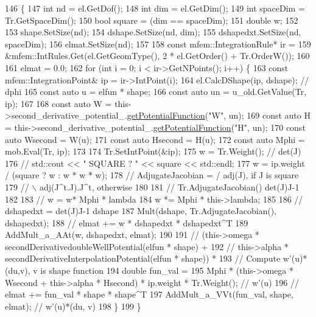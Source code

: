 \begin{DoxyCode}
146                             \{
147   \textcolor{keywordtype}{int} nd = el.GetDof();
148   \textcolor{keywordtype}{int} dim = el.GetDim();
149   \textcolor{keywordtype}{int} spaceDim = Tr.GetSpaceDim();
150   \textcolor{keywordtype}{bool} square = (dim == spaceDim);
151   \textcolor{keywordtype}{double} w;
152 
153   shape.SetSize(nd);
154   dshape.SetSize(nd, dim);
155   dshapedxt.SetSize(nd, spaceDim);
156   elmat.SetSize(nd);
157 
158   \textcolor{keyword}{const} mfem::IntegrationRule* ir =
159       &mfem::IntRules.Get(el.GetGeomType(), 2 * el.GetOrder() + Tr.OrderW());
160 
161   elmat = 0.0;
162   \textcolor{keywordflow}{for} (\textcolor{keywordtype}{int} i = 0; i < ir->GetNPoints(); i++) \{
163     \textcolor{keyword}{const} mfem::IntegrationPoint& ip = ir->IntPoint(i);
164     el.CalcDShape(ip, dshape);  \textcolor{comment}{// dphi}
165     \textcolor{keyword}{const} \textcolor{keyword}{auto} u = elfun * shape;
166     \textcolor{keyword}{const} \textcolor{keyword}{auto} un = u\_old.GetValue(Tr, ip);
167 
168     \textcolor{keyword}{const} \textcolor{keyword}{auto} W = this->second\_derivative\_potential\_.\hyperlink{classPotentialFunctions_a63a86cbadc57d531e0c0fa987ac9fea6}{getPotentialFunction}(\textcolor{stringliteral}{"W"}, un);
169     \textcolor{keyword}{const} \textcolor{keyword}{auto} H = this->second\_derivative\_potential\_.\hyperlink{classPotentialFunctions_a63a86cbadc57d531e0c0fa987ac9fea6}{getPotentialFunction}(\textcolor{stringliteral}{"H"}, un);
170     \textcolor{keyword}{const} \textcolor{keyword}{auto} Wsecond = W(u);
171     \textcolor{keyword}{const} \textcolor{keyword}{auto} Hsecond = H(u);
172     \textcolor{keyword}{const} \textcolor{keyword}{auto} Mphi = mob.Eval(Tr, ip);
173 
174     Tr.SetIntPoint(&ip);
175     w = Tr.Weight();  \textcolor{comment}{// det(J)}
176     \textcolor{comment}{// std::cout << " SQUARE  ? " << square << std::endl;}
177     w = ip.weight / (square ? w : w * w * w);
178     \textcolor{comment}{// AdjugateJacobian = / adj(J),         if J is square}
179     \textcolor{comment}{//                    \(\backslash\) adj(J^t.J).J^t, otherwise}
180 
181     \textcolor{comment}{// Tr.AdjugateJacobian() det(J)J-1}
182 
183     \textcolor{comment}{// w = w* Mphi * lambda}
184     w *= Mphi * this->lambda;
185 
186     \textcolor{comment}{// dshapedxt =  det(J)J-1 dshape}
187     Mult(dshape, Tr.AdjugateJacobian(), dshapedxt);
188     \textcolor{comment}{// elmat += w * dshapedxt * dshapedxt^T}
189     AddMult\_a\_AAt(w, dshapedxt, elmat);
190 
191     \textcolor{comment}{//  (this->omega * secondDerivativedoubleWellPotential(elfun * shape) +}
192     \textcolor{comment}{//   this->alpha * secondDerivativeInterpolationPotential(elfun * shape)) *}
193     \textcolor{comment}{// Compute w'(u)*(du,v), v is shape function}
194     \textcolor{keywordtype}{double} fun\_val =
195         Mphi * (this->omega * Wsecond + this->alpha * Hsecond) * ip.weight * Tr.Weight();  \textcolor{comment}{// w'(u)}
196     \textcolor{comment}{// elmat += fun\_val * shape * shape^T}
197     AddMult\_a\_VVt(fun\_val, shape, elmat);  \textcolor{comment}{// w'(u)*(du, v)}
198   \}
199 \}
\end{DoxyCode}
